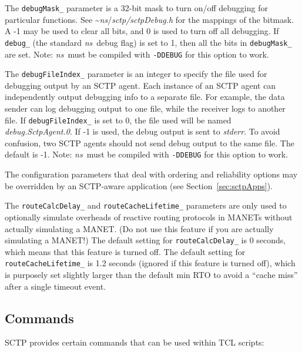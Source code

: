 	 The {\tt debugMask\_} parameter is a 32-bit mask to turn on/off
	 debugging for particular functions. See
	 \textasciitilde\emph{ns}/{\em{sctp/sctpDebug.h}} for the mappings of the bitmask. A -1
	 may be used to clear all bits, and 0 is used to turn off all
	 debugging. If {\tt debug\_} (the standard \emph{ns}~debug flag) is set to
	 1, then all the bits in {\tt debugMask\_} are set. Note: \emph{ns}~must
	 be compiled with {\tt -DDEBUG} for this option to work.

	 The {\tt debugFileIndex\_} parameter is an integer to specify the
	 file used for debugging output by an SCTP agent. Each instance of
	 an SCTP agent can independently output debugging info to a
	 separate file. For example, the data sender can log debugging
	 output to one file, while the receiver logs to another file. If
	 {\tt debugFileIndex\_} is set to 0, the file used will be named
	 {\em debug.SctpAgent.0}. If -1 is used, the debug output is sent
	 to {\em stderr}. To avoid confusion, two SCTP agents should not
	 send debug output to the same file. The default is -1.  Note:
	 \emph{ns}~must be compiled with {\tt -DDEBUG} for this option to work.

	 The configuration parameters that deal with ordering and
	 reliability options may be overridden by an SCTP-aware
	 application (see Section~\ref{sec:sctpApps}).

	 The {\tt routeCalcDelay\_} and {\tt routeCacheLifetime\_}
	 parameters are only used to optionally simulate overheads of
	 reactive routing protocols in MANETs without actually simulating
	 a MANET. (Do not use this feature if you are actually simulating
	 a MANET!) The default setting for {\tt routeCalcDelay\_} is 0
	 seconds, which means that this feature is turned off. The default
	 setting for {\tt routeCacheLifetime\_} is 1.2 seconds (ignored if
	 this feature is turned off), which is purposely set slightly
	 larger than the default min RTO to avoid a ``cache miss'' after a
	 single timeout event.

      \subsection{Commands}
      \label{sec:sctpCommands}

	 SCTP provides certain commands that can be used within TCL
	 scripts:

